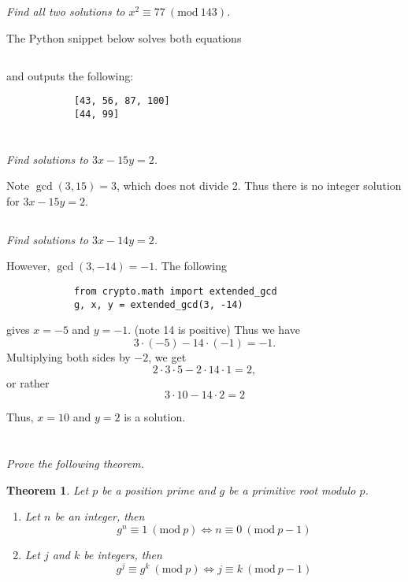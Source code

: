 \documentclass[12pt]{article}
\renewcommand{\mod}[1]{\mathrm{mod}\ #1}
\renewcommand{\pmod}[1]{\ (\mod{#1})}
\newtheorem*{thm}{Theorem}
\begin{document}
    \subsection{} \textit{Find all two solutions to $x^2 \equiv 77 \pmod{143}$.}

        The Python snippet below solves both equations

        \inputminted{python}{hw2_3.py}

        and outputs the following:

        \begin{verbatim}
            [43, 56, 87, 100]
            [44, 99]
        \end{verbatim}
\section{}
    \subsection{} \textit{Find solutions to $3x - 15y = 2$.}

        Note $\gcd(3, 15) = 3$, which does not divide 2. Thus there is no integer solution for $3x - 15y = 2$.
    \subsection{} \textit{Find solutions to $3x - 14y = 2$.}

        However, $\gcd(3, -14) = -1$. The following

        \begin{verbatim}
            from crypto.math import extended_gcd
            g, x, y = extended_gcd(3, -14)
        \end{verbatim}

        gives $x = -5$ and $y = -1$. (note 14 is positive) Thus we have $$3 \cdot (-5) - 14 \cdot (-1) = -1.$$ Multiplying both sides by $-2$, we get $$2 \cdot 3 \cdot 5 - 2 \cdot 14 \cdot 1 = 2,$$ or rather $$3 \cdot 10 - 14 \cdot 2 = 2$$

        Thus, $x = 10$ and $y = 2$ is a solution.

\section{} \textit{Prove the following theorem.}
    \begin{thm}
        Let $p$ be a position prime and $g$ be a primitive root modulo $p$.
        \begin{enumerate}
            \item Let $n$ be an integer, then $$g^n \equiv 1 \pmod{p} \Longleftrightarrow n \equiv 0 \pmod{p - 1}$$
            \item Let $j$ and $k$ be integers, then $$g^j \equiv g^k \pmod{p} \Longleftrightarrow j \equiv k \pmod{p - 1}$$
        \end{enumerate}
    \end{thm}
\end{document}
